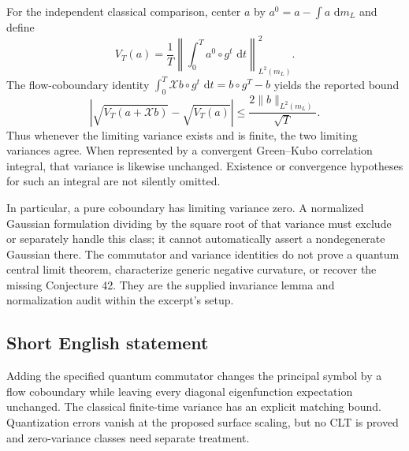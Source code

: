 \documentclass[11pt]{article}
\newcommand{\dd}{\,\mathrm{d}}
\begin{document}
For the independent classical comparison, center \(a\) by \(a^0=a-\int a\,\dd m_L\) and define
\[
 V_T(a)=\frac1T\left\|\int_0^T a^0\circ g^t\,\dd t\right\|_{L^2(m_L)}^2.
\]
The flow-coboundary identity \(\int_0^T\mathcal Xb\circ g^t\,\dd t=b\circ g^T-b\) yields the reported bound
\[
 \left|\sqrt{V_T(a+\mathcal Xb)}-\sqrt{V_T(a)}\right|
 \leq\frac{2\|b\|_{L^2(m_L)}}{\sqrt T}.
\]
Thus whenever the limiting variance exists and is finite, the two limiting variances agree. When represented by a convergent Green--Kubo correlation integral, that variance is likewise unchanged. Existence or convergence hypotheses for such an integral are not silently omitted.

In particular, a pure coboundary has limiting variance zero. A normalized Gaussian formulation dividing by the square root of that variance must exclude or separately handle this class; it cannot automatically assert a nondegenerate Gaussian there. The commutator and variance identities do not prove a quantum central limit theorem, characterize generic negative curvature, or recover the missing Conjecture 42. They are the supplied invariance lemma and normalization audit within the excerpt's setup.
\subsection{Short English statement}
Adding the specified quantum commutator changes the principal symbol by a flow coboundary while leaving every diagonal eigenfunction expectation unchanged. The classical finite-time variance has an explicit matching bound. Quantization errors vanish at the proposed surface scaling, but no CLT is proved and zero-variance classes need separate treatment.
\end{document}
